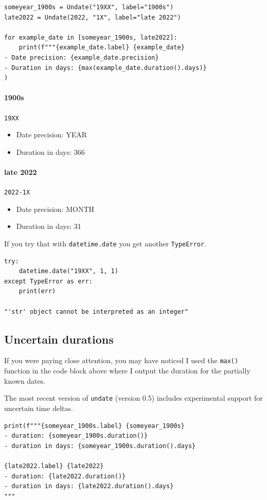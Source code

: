 \documentclass{anthology-ch}         %
\begin{document}
\begin{verbatim}
someyear_1900s = Undate("19XX", label="1900s")
late2022 = Undate(2022, "1X", label="late 2022")

for example_date in [someyear_1900s, late2022]:
    print(f"""{example_date.label} {example_date}
- Date precision: {example_date.precision}
- Duration in days: {max(example_date.duration().days)}
)
\end{verbatim}

\paragraph{1900s} \texttt{19XX}
\begin{itemize}
    \item Date precision: YEAR
    \item Duration in days: 366
\end{itemize}
    
\paragraph{late 2022} \texttt{2022-1X}
\begin{itemize}
    \item Date precision: MONTH
    \item Duration in days: 31
\end{itemize}    

    
If you try that with \texttt{datetime.date} you get another \texttt{TypeError}.    

\begin{verbatim}
try:
    datetime.date("19XX", 1, 1)
except TypeError as err:
    print(err)

"'str' object cannot be interpreted as an integer"
\end{verbatim}

\subsection{Uncertain durations}

If you were paying close attention, you may have noticed I used the
\texttt{max()} function in the code block above where I output the duration for the partially known dates.

The most recent version of \texttt{undate} (version 0.5) includes experimental support for 
uncertain time deltas.

\begin{verbatim}
print(f"""{someyear_1900s.label} {someyear_1900s}
- duration: {someyear_1900s.duration()}
- duration in days: {someyear_1900s.duration().days}

{late2022.label} {late2022}
- duration: {late2022.duration()}
- duration in days: {late2022.duration().days}
"""
\end{verbatim}
\end{document}

